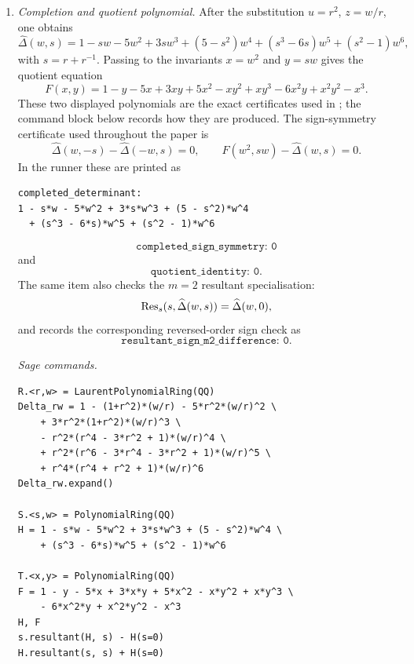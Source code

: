 \begin{enumerate}[label=(\alph*)]
  \item \textit{Completion and quotient polynomial.}\quad
    After the substitution \(u=r^2\), \(z=w/r\), one obtains
    \[
      \widehat\Delta(w,s)
      =1-sw-5w^2+3sw^3+(5-s^2)w^4+(s^3-6s)w^5+(s^2-1)w^6,
    \]
    with \(s=r+r^{-1}\). Passing to the invariants \(x=w^2\) and
    \(y=sw\) gives the quotient equation
    \[
      F(x,y)=1-y-5x+3xy+5x^2-xy^2+xy^3-6x^2y+x^2y^2-x^3.
    \]
    These two displayed polynomials are the exact certificates used in
    ;
    the command block below records how they are produced.  The
    sign-symmetry certificate used throughout the paper is
    \[
      \widehat\Delta(w,-s)-\widehat\Delta(-w,s)=0,
      \qquad
      F(w^2,sw)-\widehat\Delta(w,s)=0.
    \]
    In the runner these are printed as
    \begin{verbatim}
completed_determinant:
1 - s*w - 5*w^2 + 3*s*w^3 + (5 - s^2)*w^4
  + (s^3 - 6*s)*w^5 + (s^2 - 1)*w^6
    \end{verbatim}
    \[
      \texttt{completed\_sign\_symmetry: 0}
    \]
    and
    \[
      \texttt{quotient\_identity: 0}.
    \]
    The same item also checks the \(m=2\) resultant specialisation:
    \[
      \operatorname{Res}_s(s,\widehat\Delta(w,s))=\widehat\Delta(w,0),
    \]
    and records the corresponding reversed-order sign check as
    \[
      \texttt{resultant\_sign\_m2\_difference: 0}.
    \]

    \medskip
    \noindent\textit{Sage commands.}
\begin{verbatim}
R.<r,w> = LaurentPolynomialRing(QQ)
Delta_rw = 1 - (1+r^2)*(w/r) - 5*r^2*(w/r)^2 \
    + 3*r^2*(1+r^2)*(w/r)^3 \
    - r^2*(r^4 - 3*r^2 + 1)*(w/r)^4 \
    + r^2*(r^6 - 3*r^4 - 3*r^2 + 1)*(w/r)^5 \
    + r^4*(r^4 + r^2 + 1)*(w/r)^6
Delta_rw.expand()

S.<s,w> = PolynomialRing(QQ)
H = 1 - s*w - 5*w^2 + 3*s*w^3 + (5 - s^2)*w^4 \
    + (s^3 - 6*s)*w^5 + (s^2 - 1)*w^6

T.<x,y> = PolynomialRing(QQ)
F = 1 - y - 5*x + 3*x*y + 5*x^2 - x*y^2 + x*y^3 \
    - 6*x^2*y + x^2*y^2 - x^3
H, F
s.resultant(H, s) - H(s=0)
H.resultant(s, s) + H(s=0)
\end{verbatim}


\end{enumerate}

